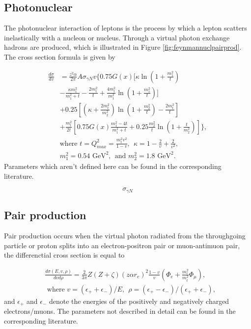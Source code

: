 \subsection{Photonuclear}
The photonuclear interaction of leptons is the process by which a lepton scatters inelastically with a nucleon or nucleus. Through a virtual photon exchange hadrons are produced, which is illustrated in Figure \ref{fig:feynmannuclpairprod}. The cross section formula is given by

\begin{equation} 
\begin{split} 
\frac{d\sigma}{dv} &= \frac{z^2 \alpha}{2\pi} A \sigma_{\gamma N} v  \Bigg \lbrace  0.75 G(x) \Bigg [\kappa \ln \left(1+\frac{m_1^2}{t}\right) \\
& -\frac{\kappa m_1^2}{m_1^2 + t} - \frac{2 m_t^2}{t} + \frac{4 m_t^2}{m_1^2} \ln \left(1+ \frac{m_1^2}{t} \right)  \Bigg] \\
& + 0.25 \left[ \left(\kappa + \frac{2m_t^2}{m_2^2} \right) \ln \left(1+\frac{m_2^2}{t} \right) - \frac{2m_t^2}{t}\right]\\
& + \frac{m_t^2}{2t} \left[ 0.75 G(x) \frac{m_1^2 -4t}{m_1^2 +t} +0.25 \frac{m_2^2}{t} \ln \left(1+\frac{t}{m_2^2} \right) \right] \Bigg \rbrace,\\
& \textrm{where \ \ } t = Q_{max}^2 = \frac{m_t^2 v^2}{1-v}, \ \ \kappa = 1-\frac{2}{v} + \frac{2}{v^2}, \\
& m_1^2 = 0.54 \textrm{ GeV}^2, \ \ \textrm{and \ \ \ } m_2^2 = 1.8 \textrm{\ GeV}^2.
\end{split} 
\end{equation}
Parameters which aren't defined here can be found in the corresponding literature.

\begin{equation}
\sigma_{\gamma N}
\end{equation}
\subsection{Pair production}
Pair production occurs when the virtual photon radiated from the throughgoing particle or proton splits into an electron-positron pair or muon-antimuon pair, the differenctial cross section is equal to
 
\begin{equation}
\begin{split}
&\frac{d\sigma(E,v,\rho)}{dvd\rho} = \frac{2}{3\pi} Z(Z+\zeta)(z \alpha r_e)^2 \frac{1-v}{v} \left(\Phi_e + \frac{m_e^2}{m_t^2} \Phi_\mu \right), \\
& \textrm{ where \ \ } v = (\epsilon_+ + \epsilon_-)/E, \ \ \rho = (\epsilon_+ - \epsilon_-)/(\epsilon_+ + \epsilon_-),
\end{split}
\end{equation}
and $\epsilon_+$ and $\epsilon_-$ denote the energies of the positively and negatively charged electrons/muons. The parameters not described in detail can be found in the corresponding literature.

